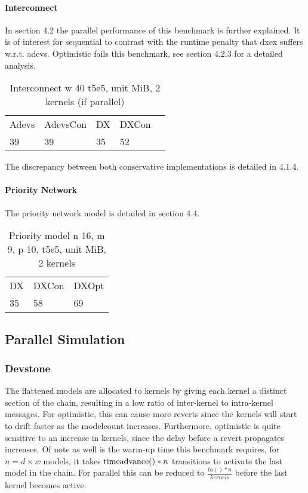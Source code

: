 \paragraph*{Interconnect}
In section 4.2 the parallel performance of this benchmark is further explained. It is of interest for sequential to contrast with the runtime penalty that dxex suffers w.r.t. adevs. Optimistic fails this benchmark, see section 4.2.3 for a detailed analysis.
\begin{table}[lhtb]
	\centering
	\caption{Interconnect w 40 t5e5, unit MiB, 2 kernels (if parallel)}
	\label{iconn_mem}
	\begin{tabular}{lllll}
		Adevs & AdevsCon &DX &DXCon\\
		39 & 39 & 35 & 52  \\
	\end{tabular}
\end{table}
The discrepancy between both conservative implementations is detailed in 4.1.4.
		
\paragraph*{Priority Network}
The priority network model is detailed in section 4.4.
\begin{table}[lhtb]
	\centering
	\caption{Priority model n 16, m 9, p 10,  t5e5, unit MiB, 2 kernels}
	\label{pmod_mem}
	\begin{tabular}{lll}
		DX &DXCon &DXOpt\\
		35 & 58 &69\\
	\end{tabular}
\end{table}

\subsection{Parallel Simulation}
\subsubsection{Devstone}
The flattened models are allocated to kernels by giving each kernel a distinct section of the chain, resulting in a low ratio of inter-kernel to intra-kernel messages. For optimistic, this can cause more reverts since the kernels will start to drift faster as the modelcount increases. Furthermore, optimistic is quite sensitive to an increase in kernels, since the delay before a revert propagates increases. Of note as well is the warm-up time this benchmark requires, for $n=d\times w$ models, it takes $\textup{timeadvance}()*n$ transitions to activate the last model in the chain. For parallel this can be reduced to $\frac{ta()*n}{kernels}$ before the last kernel becomes active.
